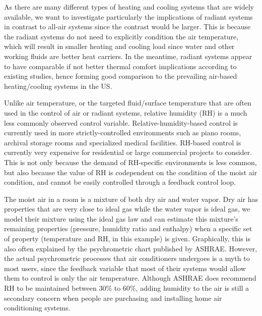 
As there are many different types of heating and cooling systems that are widely available, we want to investigate particularly the implications of radiant systems in contrast to all-air systems since the contrast would be larger. This is because the radiant systems do not need to explicitly condition the air temperature, which will result in smaller heating and cooling load since water and other working fluids are better heat carriers. In the meantime, radiant systems appear to have comparable if not better thermal comfort implications according to existing studies, hence forming good comparison to the prevailing air-based heating/cooling systems in the US.

Unlike air temperature, or the targeted fluid/surface temperature that are often used in the control of air or radiant systems, relative humidity (RH) is a much less commonly observed control variable. Relative-humidity-based control is currently used in more strictly-controlled environments such as piano rooms, archival storage rooms and specialized medical facilities. RH-based control is currently very expensive for residential or large commercial projects to consider. This is not only because the demand of RH-specific environments is less common, but also because the value of RH is codependent on the condition of the moist air condition, and cannot be easily controlled through a feedback control loop. 

The moist air in a room is a mixture of both dry air and water vapor. Dry air has properties that are very close to ideal gas while the water vapor is ideal gas, we model their mixture using the ideal gas law and can estimate this mixture’s remaining properties (pressure, humidity ratio and enthalpy) when a specific set of property (temperature and RH, in this example) is given. Graphically, this is also often explained by the psychrometric chart published by ASHRAE. However, the actual psychrometric processes that air conditioners undergoes is a myth to most users, since the feedback variable that most of their systems would allow them to control is only the air temperature. Although ASHRAE does recommend RH to be maintained between 30\% to 60\%, adding humidity to the air is still a secondary concern when people are purchasing and installing home air conditioning systems. 

